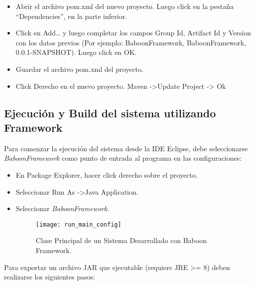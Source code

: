 \begin{enumerate}
\begin{itemize}
          \item Abrir el archivo pom.xml del nuevo proyecto. Luego click en la
          pestaña “Dependencies”, en la parte inferior.
          \item Click en Add… y  luego completar los campos Group Id, Artifact
          Id y Version con los datos previos (Por ejemplo:
          BaboonFramework, BaboonFramework, 0.0.1-SNAPSHOT). Luego click en OK.
          \item Guardar el archivo pom.xml del proyecto.
          \item Click Derecho en el nuevo proyecto. Maven -\textgreater Update Project -\textgreater
          Ok
        \end{itemize}
\end{enumerate}


\subsection {Ejecución y Build del sistema utilizando \nombreFramework
Framework}

Para comenzar la ejecución del sistema desde la IDE Eclipse, debe seleccionarse
\emph{BaboonFramework} como punto de entrada al programa en las configuraciones:
    \begin{itemize}
      \item En Package Explorer, hacer click derecho sobre el proyecto.
      \item Seleccionar Run As -\textgreater Java Application.
      \item Seleccionar \emph{BaboonFramework}.
      \begin{figure}[H]
            \centering
            \texttt{[image: run\_main\_config]}
            \caption{Clase Principal de un Sistema Desarrollado con Baboon Framework.}
            \label{fig:baboon_main}
      \end{figure}
    \end{itemize}

Para exportar un archivo JAR que ejecutable (requiere JRE \textgreater= 8) deben
realizarse los siguientes pasos:

